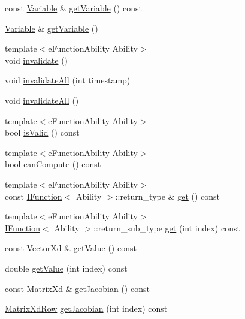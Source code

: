 \begin{DoxyCompactItemize}
\item 
const \hyperlink{classocra_1_1Variable}{Variable} \& \hyperlink{classocra_1_1Function_a8fdc3609523ec400c3f21d797e329518}{get\+Variable} () const 
\item 
\hyperlink{classocra_1_1Variable}{Variable} \& \hyperlink{classocra_1_1Function_a2528d95d06e21e60eff14bb3ee484345}{get\+Variable} ()
\item 
{\footnotesize template$<$e\+Function\+Ability Ability$>$ }\\void \hyperlink{classocra_1_1Function_aa66bc14ed8c17e88224fa2469d7d3a7e}{invalidate} ()
\item 
void \hyperlink{classocra_1_1Function_ae33c94ee0c807b05869609f7a166ff82}{invalidate\+All} (int timestamp)
\item 
void \hyperlink{classocra_1_1Function_a2ebd8ade069fc19b03e6ab9cef2c09c3}{invalidate\+All} ()
\item 
{\footnotesize template$<$e\+Function\+Ability Ability$>$ }\\bool \hyperlink{classocra_1_1Function_ab96cba1e4836b329d75d644f33515812}{is\+Valid} () const 
\item 
{\footnotesize template$<$e\+Function\+Ability Ability$>$ }\\bool \hyperlink{classocra_1_1Function_a3f5c3058ffc32e770575fbbf6ada5a1b}{can\+Compute} () const 
\item 
{\footnotesize template$<$e\+Function\+Ability Ability$>$ }\\const \hyperlink{classocra_1_1IFunction}{I\+Function}$<$ Ability $>$\+::return\+\_\+type \& \hyperlink{classocra_1_1Function_ac5fa0e421773ff2afb91eca6d277eead}{get} () const 
\item 
{\footnotesize template$<$e\+Function\+Ability Ability$>$ }\\\hyperlink{classocra_1_1IFunction}{I\+Function}$<$ Ability $>$\+::return\+\_\+sub\+\_\+type \hyperlink{classocra_1_1Function_ad263f1028d7aa28d8741e924f9178e01}{get} (int index) const 
\item 
const Vector\+Xd \& \hyperlink{classocra_1_1Function_a8af791aa06106d1d365ea42a7b4f82ac}{get\+Value} () const 
\item 
double \hyperlink{classocra_1_1Function_aa9dbfa9ec21e7f9bd3fe74188be53651}{get\+Value} (int index) const 
\item 
const Matrix\+Xd \& \hyperlink{classocra_1_1Function_a3d851cc99dfa3150a9eff6ad10b35de6}{get\+Jacobian} () const 
\item 
\hyperlink{namespaceocra_a608bf0522317ed1df3bbfc6a5753bc01}{Matrix\+Xd\+Row} \hyperlink{classocra_1_1Function_a609a03f90b2c2c221753bdf509fe7269}{get\+Jacobian} (int index) const 
\end{DoxyCompactItemize}

